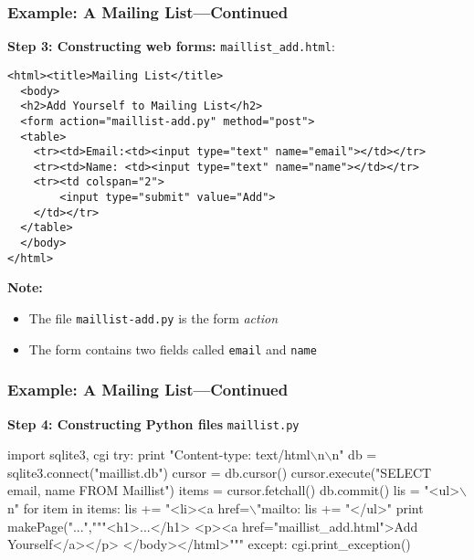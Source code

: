 \documentclass[dvipsnames]{beamer}
\begin{document}
\begin{frame}[fragile=singleslide]
\frametitle{Example: A Mailing List---Continued} 
\textbf{Step 3: Constructing web forms:} \texttt{maillist\_add.html}:
\begin{small}
\begin{verbatim}
<html><title>Mailing List</title>
  <body>
  <h2>Add Yourself to Mailing List</h2>
  <form action="maillist-add.py" method="post">
  <table>
    <tr><td>Email:<td><input type="text" name="email"></td></tr>
    <tr><td>Name: <td><input type="text" name="name"></td></tr>
    <tr><td colspan="2">
        <input type="submit" value="Add">
    </td></tr>
  </table>  
  </body>
</html>
\end{verbatim}
\end{small}

\textbf{Note:}
\begin{itemize}
\item The file \texttt{maillist-add.py} is the form \emph{action}
\item The form contains two fields called \texttt{email} and \texttt{name}
\end{itemize}
\end{frame}

\begin{frame}[fragile=singleslide]
\frametitle{Example: A Mailing List---Continued}
\textbf{Step 4: Constructing Python files}
\texttt{maillist.py}
\begin{small}
\begin{semiverbatim}
import sqlite3, cgi
try:
    print "Content-type: text/html\(\backslash{}\)n\(\backslash{}\)n"
    db = sqlite3.connect("maillist.db")
    cursor = db.cursor()
    cursor.execute("SELECT email, name FROM Maillist")
    items = cursor.fetchall()
    db.commit()
    lis = "<ul>\(\backslash{}\)n"
    for item in items:
       lis += "<li><a href=\(\backslash{}\)"mailto:%
    lis += "</ul>"
    print makePage("...","""<h1>...</h1>%
          <p><a href="maillist_add.html">Add Yourself</a></p>
          </body></html>""" %
except: 
    cgi.print_exception()
\end{semiverbatim}
\end{small}
\end{frame}
\end{document}
